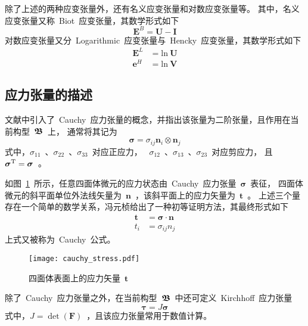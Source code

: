 除了上述的两种应变张量外，还有名义应变张量和对数应变张量等。
其中，名义应变张量又称~Biot~应变张量，其数学形式如下
\begin{equation}
	\bm{E}^{B}=\bm{U}-\bm{I}
\end{equation}
对数应变张量又分~Logarithmic~应变张量与~Hencky~应变张量，其数学形式如下
\begin{subequations}
	\begin{align}
	\bm{E}^{L} & =\mathrm{ln} ~ \bm{U} \\
	\bm{e}^{H} & =\mathrm{ln} ~ \bm{V}
	\end{align}
\end{subequations}

\subsection{应力张量的描述}
文献\cite{jinming}中引入了~Cauchy~应力张量的概念，并指出该张量为二阶张量，且作用在当前构型~$\bm{\mathfrak{B}}$~上，
通常将其记为
\begin{equation}
	\bm{\sigma}=\sigma_{ij} \bm{n}_i \otimes \bm{n}_j
\end{equation}
式中，$\sigma_{11}$~、$\sigma_{22}$~、$\sigma_{33}$~对应正应力，
~$\sigma_{12}$~、$\sigma_{13}$~、$\sigma_{23}$~对应剪应力，
且~$\bm{\sigma}^{\mathrm{T}}=\bm{\sigma}$~。

如图~\ref{fig:cauchy_stress}~所示，任意四面体微元的应力状态由~Cauchy~应力张量~$\bm{\sigma}$~表征，
四面体微元的斜平面单位外法线矢量为~$\bm{n}$~，该斜平面上的应力矢量为~$\bm{t}$~。
上述三个量存在一个简单的数学关系，冯元桢\cite{fyz}给出了一种初等证明方法，其最终形式如下
\begin{subequations}\label{eq:cauchy_stress}
	\begin{align}
	\bm{t} & =\bm{\sigma} \cdot \bm{n} \label{eq:cauchy_stress1} \\
	   t_i & =\sigma_{ij} n_j
	\end{align}
\end{subequations}
上式又被称为~Cauchy~公式。

\begin{figure}[!h]
	\centering
	\texttt{[image: cauchy\_stress.pdf]}
	\caption{四面体表面上的应力矢量~$\bm{t}$~}
	\label{fig:cauchy_stress}
\end{figure}

除了~Cauchy~应力张量之外，在当前构型~$\bm{\mathfrak{B}}$~中还可定义~Kirchhoff~应力张量
\begin{equation}\label{eq:kirchhoff_stress}
	\bm{\tau}=J \bm{\sigma}
\end{equation}
式中，$J=\det (\bm{F})$~，且该应力张量常用于数值计算。

